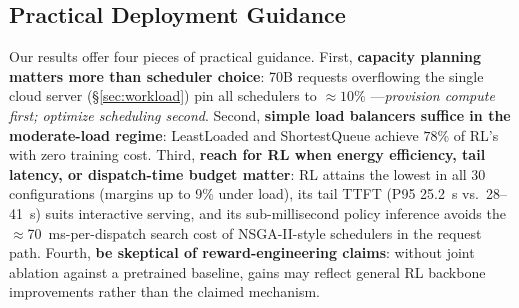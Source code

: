 \subsection{Practical Deployment Guidance}
\label{sec:guidance}

Our results offer four pieces of practical
guidance. First, \textbf{capacity planning matters more than
scheduler choice}: 70B requests overflowing the single
cloud server (\S\ref{sec:workload}) pin all schedulers to
${\approx}10\%$ \slo---\emph{provision
compute first; optimize scheduling second}. Second,
\textbf{simple load balancers suffice in the moderate-load
regime}: LeastLoaded
and ShortestQueue achieve $78\%$ of RL's \slo{}
with zero training cost. Third, \textbf{reach for RL when
energy efficiency, tail latency, or dispatch-time budget
matter}: RL attains the lowest
\etok{} in all 30 configurations (margins up to 9\% under
load), its tail TTFT
(P95 25.2~s vs.\ 28--41~s) suits
interactive serving, and its sub-millisecond policy
inference avoids the $\approx$70~ms-per-dispatch search cost
of NSGA-II-style schedulers in the request
path. Fourth, \textbf{be skeptical of
reward-engineering claims}: without joint ablation against a
pretrained baseline, gains may reflect general RL backbone
improvements rather than the claimed mechanism.
